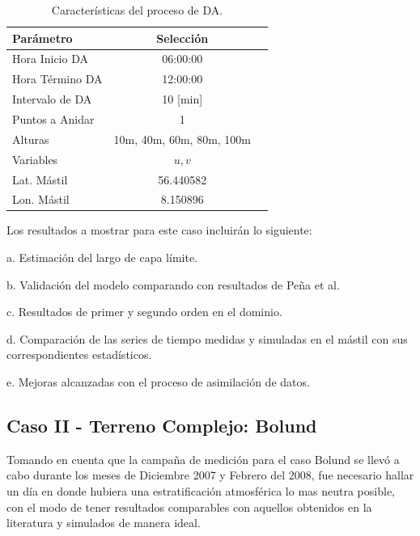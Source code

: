\begin{table}[h!]
	\caption{Características del proceso de DA.}\label{tab:05_config_da_hov}
	\centering\footnotesize
	\begin{tabular}{lcc}
		\toprule
		Parámetro & Selección \\
		\midrule
		Hora Inicio	DA 	 & 06:00:00   \\
		Hora Término DA	 		 & 12:00:00  \\
		Intervalo de DA	&	10 [min] \\
		Puntos a Anidar	 	 & 1   \\
		Alturas 	& 10m, 40m, 60m, 80m, 100m \\
		Variables	& $u,v$   \\
		Lat. Mástil	& 56.440582   \\
		Lon. Mástil	& 8.150896   \\
		
		\bottomrule
	\end{tabular}
\end{table}
\newpage
Los resultados a mostrar para este caso incluirán lo siguiente:
\begin{enumerate*}
	\item [a.]Estimación del largo de capa límite.
	\item [b.]Validación del modelo comparando con resultados de Peña et al.
	\item [c.]Resultados de primer y segundo orden en el dominio.
	\item [d.]Comparación de las series de tiempo medidas y simuladas en el mástil con sus correspondientes estadísticos.
	\item [e.]Mejoras alcanzadas con el proceso de asimilación de datos.
\end{enumerate*}

\newpage










\subsection{Caso II - Terreno Complejo: Bolund}
Tomando en cuenta que la campaña de medición para el caso Bolund se llevó a cabo durante los meses de Diciembre 2007 y Febrero del 2008, fue necesario hallar un día en donde hubiera una estratificación atmosférica lo mas neutra posible, con el modo de tener resultados comparables con aquellos obtenidos en la literatura y simulados de manera ideal.

